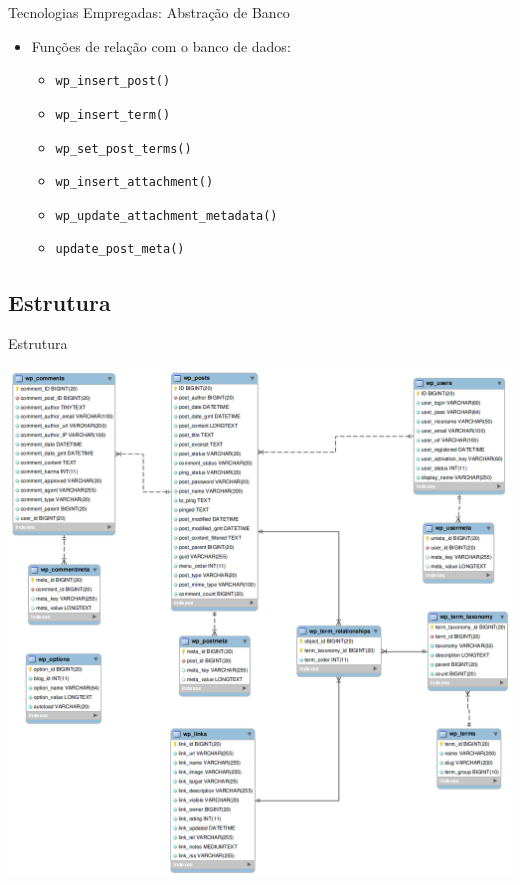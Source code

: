 \documentclass{beamer}
\begin{document}
\begin{frame}{Tecnologias Empregadas: Abstração de Banco}
    \begin{itemize}
    \pause \item Funções de relação com o banco de dados:
    \begin{itemize}
      \pause \item \texttt{wp\_insert\_post()}
      \pause \item \texttt{wp\_insert\_term()}
      \pause \item \texttt{wp\_set\_post\_terms()}
      \pause \item \texttt{wp\_insert\_attachment()}
      \pause \item \texttt{wp\_update\_attachment\_metadata()}
      \pause \item \texttt{update\_post\_meta()}
    \end{itemize}
  \end{itemize}
\end{frame}


\subsection{Estrutura}

\begin{frame}{Estrutura}
  \begin{center}
    \pause \includegraphics[height=0.8\textheight]{./img/wp-tables.png}
  \end{center}
\end{frame}
\end{document}
